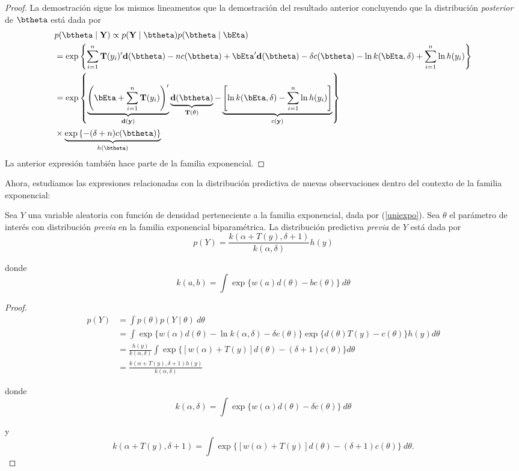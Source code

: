\begin{proof}
La demostración sigue los mismos lineamentos que la demostración del resultado anterior concluyendo que la distribución \emph{posterior} de $\btheta$ está dada por
\begin{align*}
&p(\btheta \mid \mathbf{Y}) \propto p(\mathbf{Y} \mid \btheta)p(\btheta \mid \bEta)\\
&= \exp\left\{\sum_{i=1}^n\mathbf{T}(y_i)'\mathbf{d}(\btheta) - nc(\btheta) + \bEta' \mathbf{d}(\btheta) - \delta c(\btheta) - \ln k(\bEta,\delta) +\sum_{i=1}^n\ln h(y_i)\right\}\\
& =\exp\left\{\underbrace{\left(\bEta+\sum_{i=1}^n\mathbf{T}(y_i)\right)'}_{\mathbf{d}(\mathbf{y})}
\underbrace{\mathbf{d}(\btheta)}_{\mathbf{T}(\theta)} - \underbrace{\left[\ln k(\bEta,\delta)-\sum_{i=1}^n\ln h(y_i)\right]}_{c(\mathbf{y})}\right\} \\
&  \times \underbrace{\exp\left\{-(\delta+n)c(\btheta)\right\}}_{h(\btheta)}
\end{align*}
La anterior expresión también hace parte de la familia exponencial.
\end{proof}

Ahora, estudiamos las expresiones relacionadas con la distribución predictiva de nuevas observaciones dentro del contexto de la familia exponencial:
\begin{Res}
Sea $Y$ una variable aleatoria con función de densidad perteneciente a la familia exponencial, dada por (\ref{uniexpo}). Sea $\theta$ el parámetro de interés con distribución \emph{previa} en la familia exponencial biparamétrica. La distribución predictiva \emph{previa} de $Y$ está dada por
\begin{equation}
p(Y)=\frac{k(\alpha+T(y),\delta+1)}{k(\alpha,\delta)}h(y)
\end{equation}

donde 
\begin{equation*}
k(a,b)=\int \exp\{w(a) d(\theta)-b c(\theta)\}\ d\theta
\end{equation*}
\end{Res}

\begin{proof}
\begin{align*}
p(Y)&=\int p(\theta)p(Y \mid \theta)\ d\theta\\
&=\int \exp\{w(\alpha) d(\theta)-\ln k(\alpha,\delta)-\delta c(\theta)\}\exp\{d(\theta)T(y)-c(\theta)\}h(y)d\theta\\
&=\frac{h(y)}{k(\alpha,\delta)}\int \exp\{[w(\alpha)+T(y)]d(\theta)-(\delta+1)c(\theta)\}d\theta\\
&=\frac{k(\alpha+T(y),\delta+1)h(y)}{k(\alpha,\delta)}
\end{align*}

donde
\begin{equation*}
k(\alpha,\delta)=\int \exp\{w(\alpha) d(\theta)-\delta c(\theta)\}\ d\theta
\end{equation*}

y
\begin{equation*}
k(\alpha+T(y),\delta+1)=\int \exp\{[w(\alpha)+T(y)]d(\theta)-(\delta+1)c(\theta)\} \ d\theta.
\end{equation*}
\end{proof}

